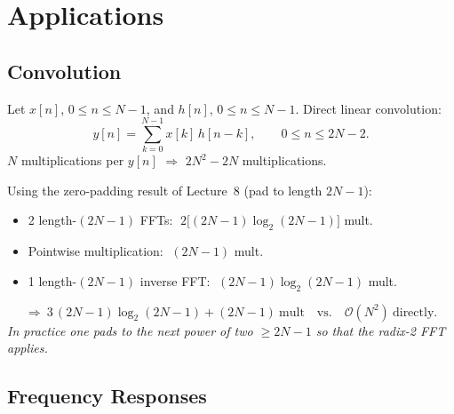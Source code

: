 \documentclass[handout_subfiles_root.tex]{subfiles}
\begin{document}
\section{Applications}

\subsection{Convolution}

\noindent Let $x[n]$, $0\le n\le N-1$, and $h[n]$, $0\le n\le N-1$. Direct linear convolution:
\begin{equation*}
y[n] = \sum_{k=0}^{N-1} x[k]\,h[n-k], \qquad 0\le n\le 2N-2.
\end{equation*}
$N$ multiplications per $y[n]$ $\Rightarrow$ $2N^2-2N$ multiplications.\footnotemark{}


\noindent Using the zero-padding result of Lecture~8 (pad to length $2N-1$):
\begin{itemize}
  \item 2 length-$(2N-1)$ FFTs: $\;2\big[(2N-1)\log_2(2N-1)\big]$ mult.
  \item Pointwise multiplication: $\;(2N-1)$ mult.
  \item 1 length-$(2N-1)$ inverse FFT: $\;(2N-1)\log_2(2N-1)$ mult.
\end{itemize}
\begin{equation*}
\Rightarrow\ 3\,(2N-1)\log_2(2N-1) + (2N-1)\ \text{mult}\quad\text{vs.}\quad \mathcal{O}(N^2)\ \text{directly}.
\end{equation*}
\noindent\textit{In practice one pads to the next power of two $\ge 2N-1$ so that the radix-2 FFT applies.}

\subsection{Frequency Responses}
\end{document}
